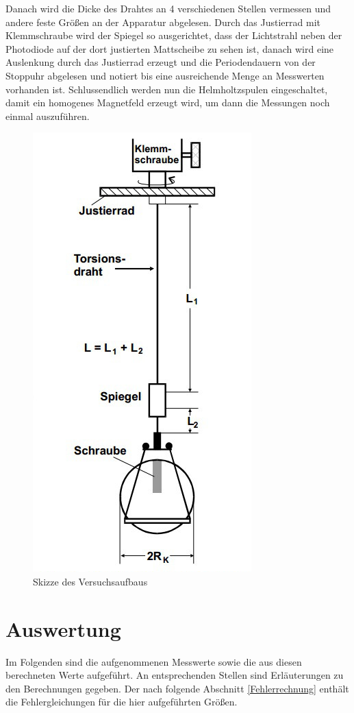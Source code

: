     Danach wird die Dicke des Drahtes an 4 verschiedenen Stellen vermessen und 
    andere feste Größen an der Apparatur abgelesen.
    Durch das Justierrad mit Klemmschraube wird der Spiegel so ausgerichtet, dass der 
    Lichtstrahl neben der Photodiode auf der dort justierten Mattscheibe zu sehen ist, danach wird 
    eine Auslenkung durch das Justierrad erzeugt und die Periodendauern von der Stoppuhr abgelesen und notiert bis 
    eine ausreichende Menge an Messwerten vorhanden ist.  
    Schlussendlich werden nun die Helmholtzspulen eingeschaltet, damit ein homogenes 
    Magnetfeld erzeugt wird, um dann die Messungen noch einmal auszuführen.
    \begin{figure}[b]
          \centering
          \includegraphics*[scale = 0.75]{Grafik/Versuchsaufbau.jpg}%
          \caption{Skizze des Versuchsaufbaus}
          \label{Aufbau}%
    \end{figure}    


  \section{Auswertung}
    \label{Auswertung}
    Im Folgenden sind die aufgenommenen Messwerte sowie die aus diesen berechneten Werte
    aufgeführt. An entsprechenden Stellen sind Erläuterungen zu den Berechnungen gegeben.
    Der nach folgende Abschnitt \ref{Fehlerrechnung} enthält die Fehlergleichungen für die hier
    aufgeführten Größen.
    
